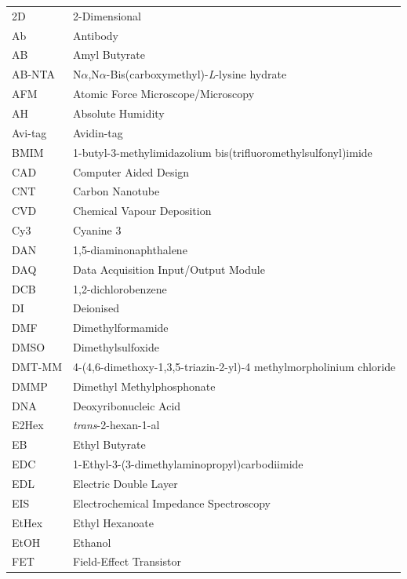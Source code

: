\documentclass[
  a4paper,
]{scrbook}
\begin{document}
\begin{table}[H]
  \begin{tabular}{@{}p{} p{}@{}}  %
    2D  & 2-Dimensional  \\[5pt]
    Ab  & Antibody  \\[5pt]
    AB  & Amyl Butyrate  \\[5pt]
    AB-NTA  & N$\alpha$,N$\alpha$-Bis(carboxymethyl)-\textit{L}-lysine hydrate  \\[5pt]
    AFM  & Atomic Force Microscope/Microscopy  \\[5pt]
    AH  & Absolute Humidity  \\[5pt]
    Avi-tag  & Avidin-tag  \\[5pt]
    BMIM  & 1-butyl-3-methylimidazolium bis(trifluoromethylsulfonyl)imide  \\[5pt]
    CAD  & Computer Aided Design \\[5pt]
    CNT  & Carbon Nanotube  \\[5pt]
    CVD  & Chemical Vapour Deposition  \\[5pt]
    Cy3  & Cyanine 3  \\[5pt]
    DAN  & 1,5-diaminonaphthalene  \\[5pt]
    DAQ  & Data Acquisition Input/Output Module  \\[5pt]
    DCB  & 1,2-dichlorobenzene  \\[5pt]
    DI  & Deionised  \\[5pt]
    DMF  & Dimethylformamide   \\[5pt]
    DMSO  & Dimethylsulfoxide   \\[5pt]
    DMT-MM   & 4-(4,6-dimethoxy-1,3,5-triazin-2-yl)-4 methylmorpholinium chloride \\[5pt]
    DMMP  & Dimethyl Methylphosphonate  \\[5pt]
    DNA  & Deoxyribonucleic Acid  \\[5pt]
    E2Hex  & \textit{trans}-2-hexan-1-al  \\[5pt]
    EB  & Ethyl Butyrate  \\[5pt]
    EDC  & 1-Ethyl-3-(3-dimethylaminopropyl)carbodiimide  \\[5pt]
    EDL  & Electric Double Layer  \\[5pt]
    EIS  & Electrochemical Impedance Spectroscopy  \\[5pt]
    EtHex  & Ethyl Hexanoate  \\[5pt]
    EtOH  & Ethanol  \\[5pt]
    FET  & Field-Effect Transistor  \\[5pt]
  \end{tabular}
\end{table}
\end{document}
